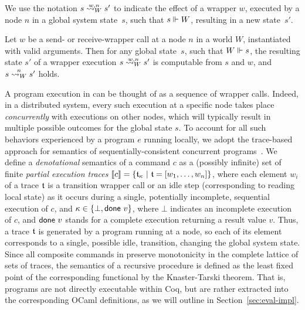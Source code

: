 We use the notation $\nsemw{W}{n}{s}{s'}$ to indicate the effect of a
wrapper $w$, executed by a node $n$ in a global system state~$s$, such
that $\Coh{s}{W}$, resulting in a new state~$s'$.

\begin{lemma}
\label{lm:wrap}
Let $w$ be a send- or receive-wrapper call at a node $n$ in a world
$W$, instantiated with valid arguments. Then for any global state~$s$,
such that $\Coh{W}{s}$, the resulting state $s'$ of a wrapper
execution $\nsemw{W}{n}{s}{s'}$ is computable from $s$ and $w$, and
$\nsem{W}{n}{s}{s'}$ holds.
\end{lemma}

%
A program execution in \disel can be thought of as a sequence of
wrapper calls.
%
Indeed, in a distributed system, every such execution at a specific
node takes place \emph{concurrently} with executions on other nodes,
which will typically result in multiple possible outcomes for the
global state $s$.
%
To account for all such behaviors experienced by a program $e$ running
locally, we adopt the trace-based approach for semantics of
sequentially-consistent concurrent programs~\cite{Brookes:TCS07}. We
define a \emph{denotational} semantics of a \disel command $c$ as a
(possibly infinite) set of finite \emph{partial execution traces}
$\denot{c} = \set{\trace_{\stat}~|~\trace = [w_1, \ldots, w_n]}$,
where each element $w_i$ of a trace $\trace$ is a transition wrapper
call or an idle step (corresponding to reading local state) as it
occurs during a single, potentially incomplete, sequential execution
of $c$, and $\stat \in \set{\bot, \done~v}$, where $\bot$ indicates an
incomplete execution of $c$, and $\done~v$ stands for a complete
execution returning a result value $v$.
%
%
Thus, a trace $\trace$ is generated by a program running at a node, so
each of its element corresponds to a single, possible idle,
transition, changing the global system state.
%
Since all composite commands in \disel preserve monotonicity in the
complete lattice of sets of traces, the semantics of a recursive
procedure is defined as the least fixed point of the corresponding
functional by the Knaster-Tarski theorem. That is, \disel programs are
not directly executable within Coq, but are rather extracted into the
corresponding OCaml definitions, as we will outline in
Section~\ref{sec:eval-impl}.


